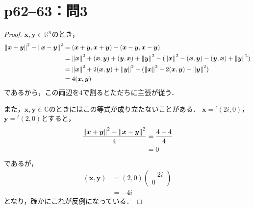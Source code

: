 \documentclass[a4paper,10pt,fleqn]{ltjsarticle}
\begin{document}
\section*{p62--63：問3}

\begin{tleftbar}
    \begin{proof}
        $\bm{x},\bm{y} \in \mathbb{R}^n$のとき，
        \begin{align*}
            \norm{\bm{x}+\bm{y}}^2 - \norm{\bm{x}-\bm{y}}^2 & = (\bm{x}+\bm{y},\bm{x}+\bm{y}) - (\bm{x}-\bm{y},\bm{x}-\bm{y})                                                                          \\
                                                            & = \norm{\bm{x}}^2 +(\bm{x},\bm{y})+(\bm{y},\bm{x})+ \norm{\bm{y}}^2 - (\norm{\bm{x}}^2 -(\bm{x},\bm{y})-(\bm{y},\bm{x})+\norm{\bm{y}}^2) \\
                                                            & = \norm{\bm{x}}^2 + 2(\bm{x},\bm{y}) + \norm{\bm{y}}^2 - (\norm{\bm{x}}^2 - 2(\bm{x},\bm{y}) + \norm{\bm{y}}^2)                          \\
                                                            & = 4(\bm{x},\bm{y})
        \end{align*}
        であるから，この両辺を$4$で割るとただちに主張が従う．

        また，$\bm{x},\bm{y} \in \mathbb{C}$のときにはこの等式が成り立たないことがある．
        $\bm{x}={}^t (2i,0)$，$\bm{y}={}^t (2,0)$とすると，
        \begin{align*}
            \frac{\norm{\bm{x}+\bm{y}}^2 - \norm{\bm{x}-\bm{y}}^2 }{4} & = \frac{4-4}{4} \\
                                                                       & =0
        \end{align*}
        であるが，
        \begin{align*}
            (\bm{x},\bm{y}) & =(2,0) \begin{pmatrix} -2i  \\ 0 \end{pmatrix} \\
                            & = -4i
        \end{align*}
        となり，確かにこれが反例になっている．
    \end{proof}
\end{tleftbar}

\newpage
\end{document}
